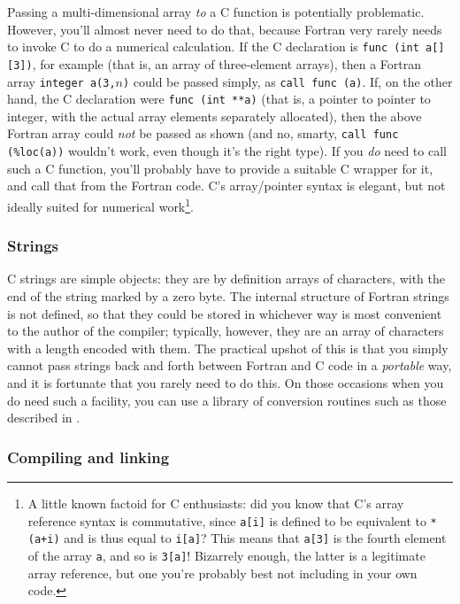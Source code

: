 \documentclass[11pt,oneside,chapters]{starlink}
\begin{document}
Passing a multi-dimensional array \emph{to} a C
function is potentially problematic.  However, you'll
almost never need to do that, because Fortran very
rarely needs to invoke C to do a numerical calculation.
If the C declaration is \texttt{func (int a[][3])},
for example (that is, an array of three-element arrays),
then a Fortran array \texttt{integer a(3,}$n$\texttt{)} could be
passed simply, as \texttt{call func (a)}.  If, on
the other hand, the C declaration were \texttt{func (int **a)}
(that is, a pointer to pointer to integer,
with the actual array elements separately allocated),
then the above Fortran array could \emph{not} be
passed as shown (and no, smarty, \texttt{call func (\%loc(a))}
wouldn't work, even though it's the
right type).  If you \emph{do} need to call such a C
function, you'll probably have to provide a suitable C
wrapper for it, and call that from the Fortran code.
C's array/pointer syntax is elegant, but not ideally
suited for numerical work\footnote{A little known
factoid for C enthusiasts: did you know that C's array
reference syntax is commutative, since \texttt{a[i]}
is defined to be equivalent to \texttt{*(a+i)} and
is thus equal to \texttt{i[a]}?  This means that
\texttt{a[3]} is the fourth element of the array
\texttt{a}, and so is \texttt{3[a]}!  Bizarrely
enough, the latter is a legitimate array reference, but
one you're probably best not including in your own
code.}.

\subsubsection{Strings}

C strings are simple objects: they are by definition
arrays of characters, with the end of the string marked
by a zero byte.  The internal structure of Fortran
strings is not defined, so that they could be stored in
whichever way is most convenient to the author of the
compiler; typically, however, they are an array of
characters with a length encoded with them.  The
practical upshot of this is that you simply cannot pass
strings back and forth between Fortran and C code in a
\emph{portable} way, and it is fortunate that you
rarely need to do this.  On those occasions when you do
need such a facility, you can use a library of
conversion routines such as those described in
.


\subsubsection{Compiling and linking}
\label{s:compilingcf}
\end{document}
